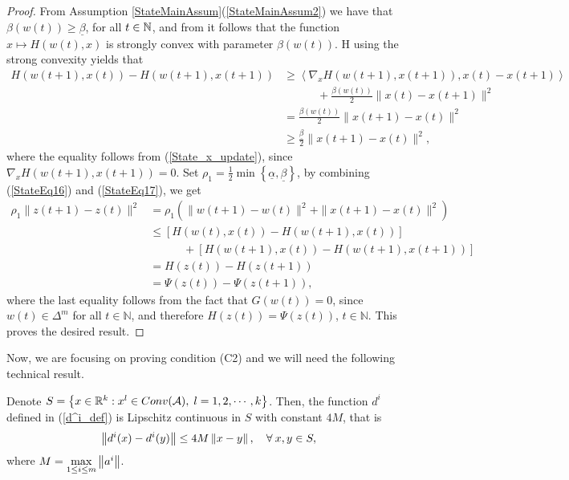 \begin{proof}
From Assumption \ref{StateMainAssum}(\ref{StateMainAssum2}) we have that $\beta(w(t)) \geq \underline{\beta}$, for all $t \in \mathbb{N}$, and from  it follows that the function $x \mapsto H(w(t),x)$ is strongly convex with parameter $\beta(w(t))$. H using the strong convexity yields that
\begin{align}
	H(w(t+1),x(t))  - H(w(t+1),x(t+1)) &\geq \left\langle \nabla_x H(w(t+1),x(t+1)) , x(t)-x(t+1) \right\rangle \nonumber \\
	&\quad\quad\quad + \frac{\beta(w(t))}{2} \|x(t) - x(t+1)\|^2 \nonumber \\
	& = \frac{\beta(w(t))}{2} \|x(t+1) - x(t)\|^2  \nonumber \\
	& \geq \frac{\underline{\beta}}{2} \|x(t+1) - x(t)\|^2 , \label{StateEq17}
\end{align}
where the equality follows from (\ref{State_x_update}), since $\nabla_{x} H(w(t+1), x(t+1)) = 0$.
Set $\rho_1 = \frac{1}{2}\min\left\lbrace \underline{\alpha} , \underline{\beta} \right\rbrace$, by combining (\ref{StateEq16}) and (\ref{StateEq17}), we get
\begin{align*}
	\rho_1 \|z(t+1)- z(t)\|^2 
	&= \rho_1 \left( \|w(t+1) - w(t)\|^2 + \|x(t+1) - x(t)\|^2  \right) \\
	&\leq \left[ H(w(t),x(t)) - H(w(t+1),x(t)) \right] \\
	&\quad\quad\quad + \left[ H(w(t+1),x(t)) - H(w(t+1),x(t+1)) \right] \\
	&= H(z(t)) - H(z(t+1)) \\
	&= \Psi(z(t)) - \Psi(z(t+1)),
\end{align*}
where the last equality follows from the fact that $G(w(t)) = 0$, since $w(t) \in \Delta^m$ for all $t \in \mathbb{N}$, and therefore $H(z(t))=\Psi(z(t))$, $t \in \mathbb{N}$. This proves the desired result.
\end{proof}

Now, we are focusing on proving condition (C2) and we will need the following technical result.

\begin{lemma} \label{StateEq11}
Denote $S=\left\lbrace x \in \mathbb{R}^k : x^l \in Conv(\mathcal{A}), \; l=1,2,\cdots,k \right\rbrace$. Then, the function $d^i$ defined in (\ref{d^i_def}) is Lipschitz continuous in $S$ with constant $4M$, that is
\begin{equation*}
	\left\Vert {d^i(x) - d^i(y)} \right\Vert \leq 4M \left\Vert {x - y} \right\Vert, \quad \forall \: x,y \in S,
\end{equation*}
where $M = \max\limits_{1 \leq i \leq m} \left\Vert {a^i} \right\Vert$.
\end{lemma}

